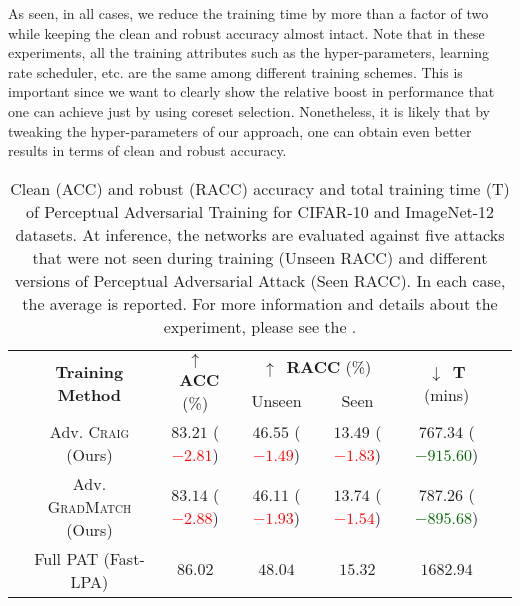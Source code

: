 \documentclass[runningheads]{llncs}
\renewcommand{\textuparrow}{$\uparrow$}
\renewcommand{\textdownarrow}{$\downarrow$}
\begin{document}
As seen, in all cases, we reduce the training time by more than a factor of two while keeping the clean and robust accuracy almost intact.
Note that in these experiments, all the training attributes such as the hyper-parameters, learning rate scheduler, etc. are the same among different training schemes.
This is important since we want to clearly show the relative boost in performance that one can achieve just by using coreset selection.
Nonetheless, it is likely that by tweaking the hyper-parameters of our approach, one can obtain even better results in terms of clean and robust accuracy.

\begin{table}[t!]
	\caption{Clean (ACC) and robust (RACC) accuracy and total training time (T) of Perceptual Adversarial Training for CIFAR-10 and ImageNet-12 datasets.
	         At inference, the networks are evaluated against five attacks that were not seen during training (Unseen RACC) and different versions of Perceptual Adversarial Attack (Seen RACC).
	         In each case, the average is reported.
	         For more information and details about the experiment, please see the .}
	\label{tab:LPA_sum}
	\begin{center}
		\begin{scriptsize}
			\setlength\tabcolsep{0.3em}
			\def\arraystretch{1.75}
			\begin{tabular}{ccccccc}
				\toprule
				\multirow{2}{*}{\rotatebox[origin=c]{90}{\textbf{Data}}}
				& \multirow{2}{*}{\textbf{Training Method}}
				& \multirow{2}{*}{\textuparrow~\textbf{ACC} (\%)}
				& \multicolumn{2}{c}{\textuparrow~\textbf{RACC} (\%)}
				& \multirow{2}{*}{\textdownarrow~\textbf{T} (mins)}\\
				\cmidrule{4-5}
				& & & Unseen & Seen\\
				\midrule
				\multirow{3}{*}{\rotatebox[origin=c]{90}{\textbf{CIFAR-10}}}
				& Adv. \textsc{Craig} (Ours)             & $83.21$ (\textcolor{red}{$-2.81$})         & $46.55$ (\textcolor{red}{$-1.49$})    & $13.49$ (\textcolor{red}{$-1.83$})    & $767.34$ (\textcolor{darkgreen}{$-915.60$}) \\
				& Adv. \textsc{GradMatch} (Ours)         & $83.14$ (\textcolor{red}{$-2.88$}) 	      & $46.11$ (\textcolor{red}{$-1.93$})    & $13.74$ (\textcolor{red}{$-1.54$})    & $787.26$ (\textcolor{darkgreen}{$-895.68$}) \\
				& Full PAT (Fast-LPA)                    & $86.02$	                                  & $48.04$                               & $15.32$                               & $1682.94$ \\

\end{tabular}
\end{scriptsize}
\end{center}
\end{table}
\end{document}

